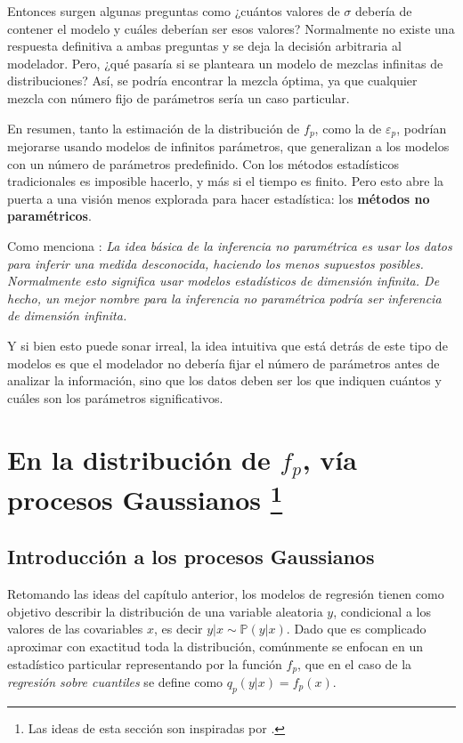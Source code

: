 Entonces surgen algunas preguntas como ¿cu\'antos valores de $\sigma$ deber\'ia de contener el modelo y cu\'ales deber\'ian ser esos valores? Normalmente no existe una respuesta definitiva a ambas preguntas y se deja la decisi\'on arbitraria al modelador. Pero, ¿qu\'e pasar\'ia si se planteara un modelo de mezclas infinitas de distribuciones? As\'i, se podr\'ia encontrar la mezcla \'optima, ya que cualquier mezcla con n\'umero fijo de par\'ametros ser\'ia un caso particular.

En resumen, tanto la estimaci\'on de la distribuci\'on de $f_p$, como la de $\varepsilon_p$, podr\'ian mejorarse usando modelos de infinitos par\'ametros, que generalizan a los modelos con un n\'umero de par\'ametros predefinido. Con los m\'etodos estad\'isticos tradicionales es imposible hacerlo, y m\'as si el tiempo es finito. Pero esto abre la puerta a una visi\'on menos explorada para hacer estad\'istica: los \textbf{m\'etodos no param\'etricos}.

Como menciona \cite{Wasserman_Nonparametric}: \textit{La idea b\'asica de la inferencia no param\'etrica es usar los datos para inferir una medida desconocida, haciendo los menos supuestos posibles. Normalmente esto significa usar modelos estad\'isticos de dimensi\'on infinita. De hecho, un mejor nombre para la inferencia no param\'etrica podr\'ia ser inferencia de dimensi\'on infinita.}

Y si bien esto puede sonar irreal, la idea intuitiva que est\'a detr\'as de este tipo de modelos es que el modelador no deber\'ia fijar el n\'umero de par\'ametros antes de analizar la informaci\'on, sino que los datos deben ser los que indiquen cu\'antos y cu\'ales son los par\'ametros significativos.

\section[En la distribuci\'on de $f_p$, v\'ia procesos Gaussianos]{
    En la distribuci\'on de $f_p$, v\'ia procesos Gaussianos
    \footnote{Las ideas de esta secci\'on son inspiradas por \cite{Rasmussen_GauProc}.}
}

\subsection{Introducci\'on a los procesos Gaussianos}

Retomando las ideas del cap\'itulo anterior, los modelos de regresi\'on tienen como objetivo describir la distribuci\'on de una variable aleatoria $y$, condicional a los valores de las covariables $x$, es decir $y|x \sim \mathbb{P}(y|x)$. Dado que es complicado aproximar con exactitud toda la distribuci\'on, com\'unmente se enfocan en un estad\'istico particular representando por la funci\'on $f_p$, que en el caso de la \textit{regresi\'on sobre cuantiles} se define como $q_p(y|x) = f_p(x)$.

